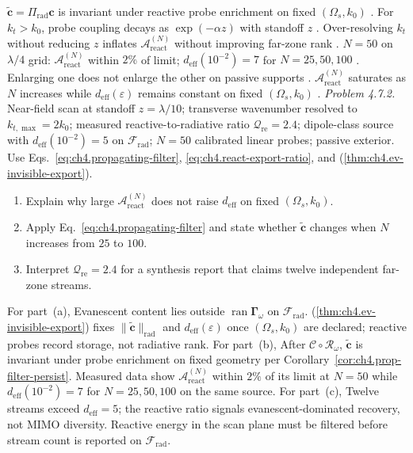 \(\widetilde{\mathbf{c}}=\Pi_{\mathrm{rad}}\mathbf{c}\) is invariant under reactive probe enrichment on fixed \((\Omega_{s},k_{0})\)
\cite{stratton1941}.
For \(k_{t}>k_{0}\), probe coupling decays as \(\exp(-\alpha z)\) with standoff \(z\) \cite{jackson1999}. Over-resolving \(k_{t}\) without
reducing \(z\) inflates \(\mathcal{A}_{\mathrm{react}}^{(N)}\) without improving far-zone rank \cite{harrington2001}.
\(N=50\) on \(\lambda/4\) grid: \(\mathcal{A}_{\mathrm{react}}^{(N)}\) within \(2\%\) of limit; \(d_{\mathrm{eff}}(10^{-2})=7\) for \(N=25,50,100\)
\cite{harrington2001}.
 Enlarging one does not enlarge the other on passive supports
\cite{stratton1941}.
\label{cor:ch4.reactive-saturation}
\(\mathcal{A}_{\mathrm{react}}^{(N)}\) saturates as \(N\) increases while \(d_{\mathrm{eff}}(\varepsilon)\) remains constant on fixed \((\Omega_{s},k_{0})\)
\cite{harrington2001}.
\emph{Problem 4.7.2.} Near-field scan at standoff $z=\lambda/10$; transverse wavenumber resolved to $k_{t,\max}=2k_{0}$; measured reactive-to-radiative ratio $\mathcal{Q}_{\mathrm{re}}=2.4$; dipole-class source with $d_{\mathrm{eff}}(10^{-2})=5$ on $\mathcal{F}_{\mathrm{rad}}$; $N=50$ calibrated linear probes; passive exterior. Use Eqs.~\eqref{eq:ch4.propagating-filter}, \eqref{eq:ch4.react-export-ratio}, and (\ref{thm:ch4.ev-invisible-export}).
\begin{enumerate}
\item[(a)] Explain why large $\mathcal{A}_{\mathrm{react}}^{(N)}$ does not raise $d_{\mathrm{eff}}$ on fixed $(\Omega_{s},k_{0})$.
\item[(b)] Apply Eq.~\eqref{eq:ch4.propagating-filter} and state whether $\widetilde{\mathbf{c}}$ changes when $N$ increases from $25$ to $100$.
\item[(c)] Interpret $\mathcal{Q}_{\mathrm{re}}=2.4$ for a synthesis report that claims twelve independent far-zone streams.
\end{enumerate}
For part~(a), Evanescent content lies outside $\operatorname{ran}\boldsymbol{\Gamma}_\omega$ on $\mathcal{F}_{\mathrm{rad}}$. (\ref{thm:ch4.ev-invisible-export}) fixes $\|\widetilde{\mathbf{c}}\|_{\mathrm{rad}}$ and $d_{\mathrm{eff}}(\varepsilon)$ once $(\Omega_{s},k_{0})$ are declared; reactive probes record storage, not radiative rank.
For part~(b), After $\mathcal{C}\circ\mathcal{R}_\omega$, $\widetilde{\mathbf{c}}$ is invariant under probe enrichment on fixed geometry per Corollary~\ref{cor:ch4.prop-filter-persist}. Measured data show $\mathcal{A}_{\mathrm{react}}^{(N)}$ within $2\%$ of its limit at $N=50$ while $d_{\mathrm{eff}}(10^{-2})=7$ for $N=25,50,100$ on the same source.
For part~(c), Twelve streams exceed $d_{\mathrm{eff}}=5$; the reactive ratio signals evanescent-dominated recovery, not MIMO diversity. Reactive energy in the scan plane must be filtered before stream count is reported on $\mathcal{F}_{\mathrm{rad}}$.
